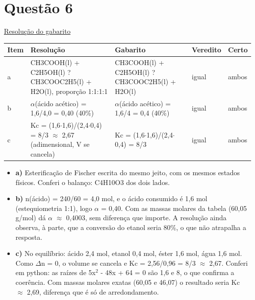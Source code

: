 \documentclass{article}%
\begin{document}
\section*{Questão 6}%
\href{https://poliedroresolve.sistemapoliedro.com.br/vestibulares/ime/2027/ime-2-fase-dia-3-28-10-2026-2-fase-dia-3/dissertativa-6-quimica-2-fase-dia-3-ime-2027}{Resolução do gabarito}\par\smallskip%
\begin{longtable}{@{}p{} p{} p{} p{} p{}@{}}\toprule Item & Resolução & Gabarito & Veredito & Certo \\ \midrule
a & CH3COOH(l) + C2H5OH(l) ? CH3COOC2H5(l) + H2O(l), proporção 1:1:1:1 & CH3COOH(l) + C2H5OH(l) ? CH3COOC2H5(l) + H2O(l) & igual & ambos \\
b & $\alpha$(ácido acético) = 1,6/4,0 = 0,40 (40\%) & $\alpha$(ácido acético) = 1,6/4 = 0,4 (40\%) & igual & ambos \\
c & Kc = (1,6$\cdot$1,6)/(2,4$\cdot$0,4) = 8/3 $\approx$ 2,67 (adimensional, V se cancela) & Kc = (1,6$\cdot$1,6)/(2,4$\cdot$0,4) = 8/3 & igual & ambos \\
\bottomrule\end{longtable}%
\begin{itemize}%
\item%
\textbf{a)} Esterificação de Fischer escrita do mesmo jeito, com os mesmos estados físicos. Conferi o balanço: C4H10O3 dos dois lados.%
\item%
\textbf{b)} n(ácido) = 240/60 = 4,0 mol, e o ácido consumido é 1,6 mol (estequiometria 1:1), logo $\alpha$ = 0,40. Com as massas molares da tabela (60,05 g/mol) dá $\alpha$ $\approx$ 0,4003, sem diferença que importe. A resolução ainda observa, à parte, que a conversão do etanol seria 80\%, o que não atrapalha a resposta.%
\item%
\textbf{c)} No equilíbrio: ácido 2,4 mol, etanol 0,4 mol, éster 1,6 mol, água 1,6 mol. Como $\Delta$n = 0, o volume se cancela e Kc = 2,56/0,96 = 8/3 $\approx$ 2,67. Conferi em python: as raízes de 5x$^2$ - 48x + 64 = 0 são 1,6 e 8, o que confirma a coerência. Com massas molares exatas (60,05 e 46,07) o resultado seria Kc $\approx$ 2,69, diferença que é só de arredondamento.%
\end{itemize}%
\end{document}
